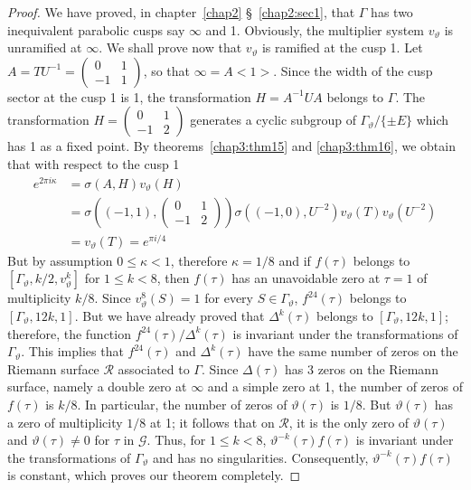 \begin{proof}
We have proved, in chapter~\ref{chap2} \S~\ref{chap2:sec1}, that $\Gamma$ has two inequivalent
parabolic cusps say $\infty$ and 1. Obviously, the multiplier system
$v_{\vartheta}$ is unramified at $\infty$. We shall prove now that
$v_{\vartheta}$ is ramified at the cusp 1. Let $A=TU^{-1}=
\left(\begin{smallmatrix} 0&1\\-1&1 \end{smallmatrix}\right)$, so that
$\infty= A<1>$. Since the width of the cusp sector at the cusp 1 is 1,
the transformation $H=A^{-1}UA$ belongs to $\Gamma$. The
transformation $H=
\left(\begin{smallmatrix} 0&1\\-1&2 \end{smallmatrix}\right)$
generates a cyclic subgroup of $\Gamma_{\vartheta}/\{\pm E\}$ which
has 1 as a fixed point. By theorems~\ref{chap3:thm15} and 
\ref{chap3:thm16}, we obtain that with
respect to the cusp 1
\begin{align*}
e^{2\pi i \kappa} & = \sigma(A,H) v_{\vartheta} (H)\\
& = \sigma \left((-1,1), \begin{pmatrix}
0&1\\-1&2
\end{pmatrix}\right) \sigma ((-1,0), U^{-2}) v_{\vartheta}
(T)v_{\vartheta} (U^{-2})\\
& = v_{\vartheta} (T) = e^{\pi i/4}
\end{align*}
But \pageoriginale by assumption $0\leq \kappa <1$, therefore
$\kappa=1/8$ and if $f(\tau)$ belongs to $[\Gamma_{\vartheta}, k/2,
  v^k_{\vartheta}]$ for $1\leq k <8$, then $f(\tau)$ has an
unavoidable zero at $\tau=1$ of multiplicity $k/8$. Since
$v^8_{\vartheta}(S)=1$ for every $S\in \Gamma_{\vartheta}$,
$f^{24}(\tau)$ belongs to $[\Gamma_{\vartheta}, 12k, 1]$. But we have
already proved that $\Delta^k(\tau)$ belongs to $[\Gamma_{\vartheta},
  12k, 1]$; therefore, the function $f^{24}(\tau)/\Delta^k(\tau)$ is
invariant under the transformations of $\Gamma_{\vartheta}$. This
implies that $f^{24}(\tau)$ and $\Delta^k(\tau)$ have the same number
of zeros on the Riemann surface $\mathscr{R}$ associated to
$\Gamma$. Since $\Delta(\tau)$ has 3 zeros on the Riemann surface,
namely a double zero at $\infty$ and a simple zero at 1, the number of
zeros of $f(\tau)$ is $k/8$. In particular, the number of zeros of
$\vartheta(\tau)$ is $1/8$. But $\vartheta(\tau)$ has a zero of
multiplicity $1/8$ at 1; it follows that on $\mathscr{R}$, it is the
only zero of $\vartheta(\tau)$ and $\vartheta(\tau)\neq 0$ for $\tau$
in $\mathscr{G}$. Thus, for $1\leq k < 8$,
$\vartheta^{-k}(\tau)f(\tau)$ is invariant under the transformations
of $\Gamma_{\vartheta}$ and has no singularities. Consequently,
$\vartheta^{-k}(\tau)f(\tau)$ is constant, which proves our theorem
completely.


\end{proof}
